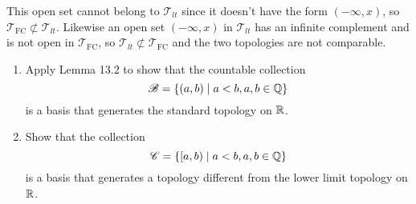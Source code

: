 \documentclass{article}
\begin{document}
This open set cannot belong to $\mathscr{T}_{lt}$ since it doesn't have the form $(-\infty, x)$, so $\mathscr{T}_{\text{FC}} \not\subset \mathscr{T}_{lt}$. Likewise an open set $(-\infty, x)$ in $\mathscr{T}_{lt}$ has an infinite complement and is not open in $\mathscr{T}_{\text{FC}}$, so $\mathscr{T}_{lt} \not\subset \mathscr{T}_{\text{FC}}$ and the two topologies are not comparable.

\begin{center}
\end{center}

\begin{problem}
\begin{enumerate}[label=\alph*)]
  \item Apply Lemma 13.2 to show that the countable collection
        $$\mathscr{B} = \{(a, b) \mid a < b, a, b \in \mathbb{Q}\}$$
        is a basis that generates the standard topology on $\mathbb{R}$.
  \item Show that the collection
        $$\mathscr{C} = \{[a, b) \mid a < b, a, b \in \mathbb{Q}\}$$
        is a basis that generates a topology different from the lower limit topology on $\mathbb{R}$.
\end{enumerate}
\end{problem}
\end{document}

